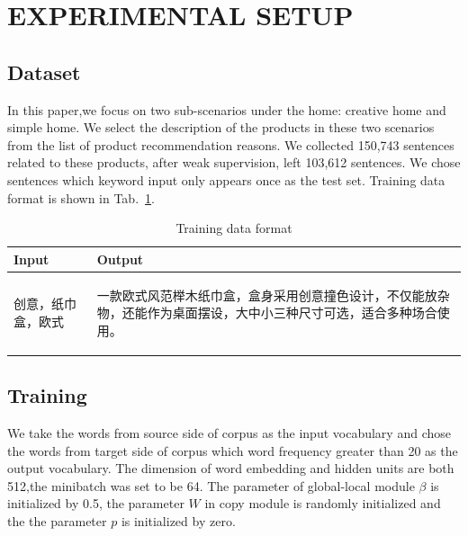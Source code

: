 \documentclass[sigconf]{acmart}
\begin{document}
\section{EXPERIMENTAL SETUP}\label{sec:experiment}
\subsection{Dataset}
In this paper,we focus on two sub-scenarios under the home: creative home and simple home. We select the description of the products in these two scenarios from the list of product recommendation reasons. We collected 150,743 sentences related to these products, after weak supervision, left 103,612 sentences. We chose sentences which keyword input only appears once as the test set. Training data format is shown in Tab.~\ref{table:format}. 

\begin{table}
\caption{Training data format }\label{table:format}
\begin{center}
\begin{tabular}{p{2.5cm}p{5cm}}
    \toprule
    Input & Output \\
    \midrule
    \begin{CJK*}{UTF8}{gbsn}
        创意，纸巾盒，欧式
    \end{CJK*} &
    \begin{CJK*}{UTF8}{gbsn}
        一款欧式风范榉木纸巾盒，盒身采用创意撞色设计，不仅能放杂物，还能作为桌面摆设，大中小三种尺寸可选，适合多种场合使用。
    \end{CJK*} \\
    \bottomrule
\end{tabular}
\end{center}
\end{table}

\subsection{Training}
We take the words from source side of corpus as the input vocabulary and chose the words from target side of corpus which word frequency greater than 20 as the output vocabulary. The dimension of word embedding and hidden units are both 512,the minibatch was set to be 64. The parameter of global-local module $\beta$ is initialized by 0.5, the parameter $W$ in copy module is randomly initialized and the the parameter $p$ is initialized by zero.
\end{document}
